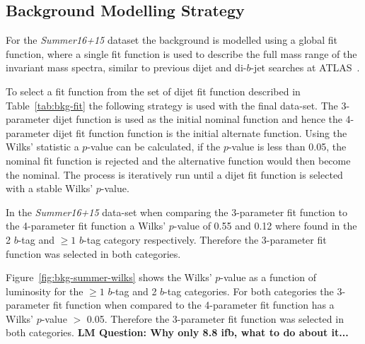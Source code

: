 \subsection{Background Modelling Strategy}
\label{sec:bkg-summer_global}

For the \textit{Summer16+15} dataset the background is modelled using a global fit function,
where a single fit function is used to describe the full mass range of the invariant mass spectra,
similar to previous dijet and di-$b$-jet searches at ATLAS~\cite{dijet-mori16_paper,dibjet-mori16_paper}.

To select a fit function from the set of dijet fit function described in Table~\ref{tab:bkg-fit} the following strategy is used with the final data-set.
The 3-parameter dijet function is used as the initial nominal function and hence the 4-parameter dijet fit function function is the initial alternate function.
Using the Wilks' statistic a $p$-value can be calculated,
if the $p$-value is less than 0.05, the nominal fit function is rejected and the alternative function would then become the nominal.
The process is iteratively run until a dijet fit function is selected with a stable Wilks' $p$-value.

In the \textit{Summer16+15} data-set when comparing the 3-parameter fit function to the 4-parameter fit function
a Wilks' $p$-value of 0.55 and 0.12 where found in the 2 $b$-tag and $\geq1$ $b$-tag category respectively.
Therefore the 3-parameter fit function was selected in both categories.

Figure~\ref{fig:bkg-summer-wilks} shows the Wilks' $p$-value as a function of luminosity
for the $\geq1$ $b$-tag and 2 $b$-tag categories.
For both categories the 3-parameter fit function when compared to the 4-parameter fit function
has a Wilks' $p$-value $>$ 0.05.
Therefore the 3-parameter fit function was selected in both categories.
\textbf{LM Question: Why only 8.8 ifb, what to do about it...}


